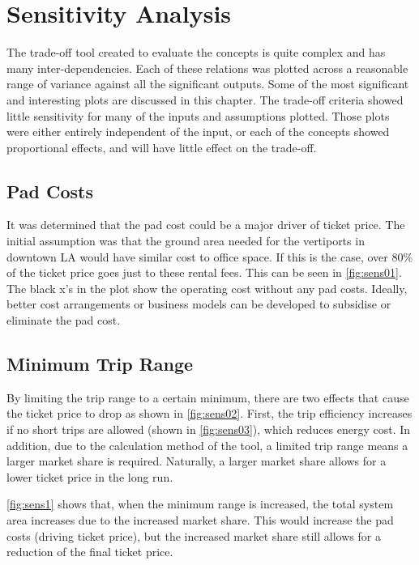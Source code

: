 \newpage
\chapter{Sensitivity Analysis} \label{ch:sensitivity}

The trade-off tool created to evaluate the concepts is quite complex and has many inter-dependencies. Each of these relations was plotted across a reasonable range of variance against all the significant outputs. Some of the most significant and interesting plots are discussed in this chapter. The trade-off criteria showed little sensitivity for many of the inputs and assumptions plotted. Those plots were either entirely independent of the input, or each of the concepts showed proportional effects, and will have little effect on the trade-off.

\section{Pad Costs}
It was determined that the pad cost could be a major driver of ticket price. The initial assumption was that the ground area needed for the vertiports in downtown LA would have similar cost to office space. If this is the case, over 80\% of the ticket price goes just to these rental fees. This can be seen in \autoref{fig:sens01}. The black x's in the plot show the operating cost without any pad costs. Ideally, better cost arrangements or business models can be developed to subsidise or eliminate the pad cost.

\section{Minimum Trip Range}
By limiting the trip range to a certain minimum, there are two effects that cause the ticket price to drop as shown in \autoref{fig:sens02}. First, the trip efficiency increases if no short trips are allowed (shown in \autoref{fig:sens03}), which reduces energy cost. In addition, due to the calculation method of the tool, a limited trip range means a larger market share is required. Naturally, a larger market share allows for a lower ticket price in the long run. 

\autoref{fig:sens1} shows that, when the minimum range is increased, the total system area increases due to the increased market share. This would increase the pad costs (driving ticket price), but the increased market share still allows for a reduction of the final ticket price. 

